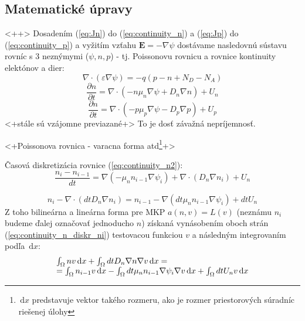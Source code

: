 \documentclass[a4paper, twoside, 12pt, onecolumn]{article}
\newcommand{\dif}{\, \mathrm{d}}	%
\newcommand{\dxdtp}[2]{\frac{\partial #1}{\partial #2}}
\begin{document}
\subsection{Matematické úpravy}\label{ch:implementacia__matematicke_upravy}<++>
Dosadením (\ref{eq:Jn}) do (\ref{eq:continuity_n}) a (\ref{eq:Jp}) do (\ref{eq:continuity_p}) a vyžitím vzťahu $\mathbf{E} = - \nabla \psi$ dostávame nasledovnú sústavu rovníc s 3 neznýmymi ($\psi, n, p$) - tj. Poissonovu rovnicu a rovnice kontinuity elektónov a dier:
\begin{equation}
	\nabla \cdot (\varepsilon \nabla \psi) = -q (p -n + N_D - N_A)
	\label{eq:poisson2}
\end{equation}
\begin{equation}
	\dxdtp{n}{t} = \nabla \cdot (-n \mu_n \nabla \psi + D_n \nabla n) + U_n
	\label{eq:continuity_n2}
\end{equation}
\begin{equation}
	\dxdtp{n}{t} = \nabla \cdot (-p \mu_p \nabla \psi - D_p \nabla p) + U_p
	\label{eq:continuity_p2}
\end{equation}
<+stále sú vzájomne previazané+> To je dosť závažná nepríjemnosť.

<+Poissonova rovnica - varacna forma atd\footnote{$\dif{x}$ predstavuje vektor takého rozmeru, ako je rozmer priestorových súradníc riešenej úlohy}+>

Časová diskretizácia rovnice (\ref{eq:continuity_n2}):
\begin{equation}
	\frac{n_{i} - n_{i-1}}{dt} = \nabla (-\mu_n n_{i-1} \nabla \psi_i) + \nabla \cdot \left( D_n \nabla n_i \right) + U_n
	\label{eq:continuity_n_diskr}
\end{equation}

\begin{equation}
	n_i - \nabla \cdot (dt D_n \nabla n_i) = n_{i-1} - \nabla (dt \mu_n n_{i-1} \nabla \psi_i) + dt U_n			
	\label{eq:continuity_n_diskr_ni}
\end{equation}
Z toho bilineárna a lineárna forma pre MKP $a(n, v) = L(v)$ (neznámu $n_i$ budeme ďalej označovať jednoducho $n$) získaná vynásobením oboch strán (\ref{eq:continuity_n_diskr_ni}) testovacou funkciou $v$ a následným integrovaním podľa $\dif{x}$:
\begin{equation}
	\begin{array}{l l}
		\int_{\Omega} n v \dif x + \int_{\Omega} dt D_n \nabla n \nabla v \dif x
		=\\
		= \int_{\Omega} n_{i-1} v \dif x - \int_{\Omega}dt \mu_n n_{i-1} \nabla \psi_i \nabla v \dif x + \int_{\Omega} dt U_n v \dif x
	\end{array}
	\label{eq:continuity_n_a_L}
\end{equation}
\end{document}
